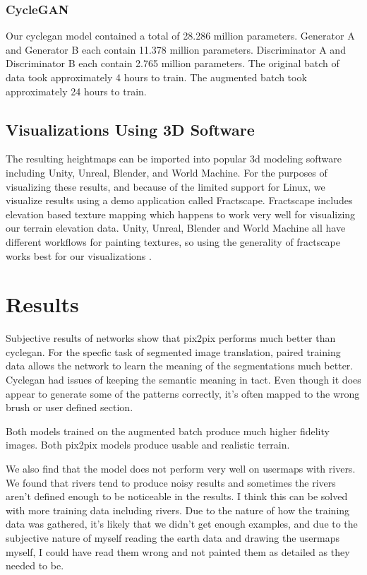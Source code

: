 \documentclass[twocolumn]{article}
\begin{document}
	\subsubsection{CycleGAN}
		Our cyclegan model contained a total of 28.286 million parameters. Generator A and Generator B each contain 11.378 million parameters. Discriminator A and Discriminator B each contain 2.765 million parameters. The original batch of data took approximately 4 hours to train. The augmented batch took approximately 24 hours to train.

	\subsection{Visualizations Using 3D Software}
	
	The resulting heightmaps can be imported into popular 3d modeling software including Unity, Unreal, Blender, and World Machine. For the purposes of visualizing these results, and because of the limited support for Linux, we visualize results using a demo application called Fractscape. Fractscape includes elevation based texture mapping which happens to work very well for visualizing our terrain elevation data. Unity, Unreal, Blender and World Machine all have different workflows for painting textures, so using the generality of fractscape works best for our visualizations \cite{starscenesoftware2006}.

	\section{Results}
	
	Subjective results of networks show that pix2pix performs much better than cyclegan. For the specfic task of segmented image translation, paired training data allows the network to learn the meaning of the segmentations much better. Cyclegan had issues of keeping the semantic meaning in tact. Even though it does appear to generate some of the patterns correctly, it's often mapped to the wrong brush or user defined section.
	
	Both models trained on the augmented batch produce much higher fidelity images. Both pix2pix models produce usable and realistic terrain.
	
	We also find that the model does not perform very well on usermaps with rivers. We found that rivers tend to produce noisy results and sometimes the rivers aren't defined enough to be noticeable in the results. I think this can be solved with more training data including rivers. Due to the nature of how the training data was gathered, it's likely that we didn't get enough examples, and due to the subjective nature of myself reading the earth data and drawing the usermaps myself, I could have read them wrong and not painted them as detailed as they needed to be.
\end{document}
